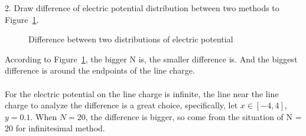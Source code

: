 \documentclass[10pt, journal, final]{IEEEtran}
\begin{document}
2. Draw difference of electric potential distribution between two methods to Figure~\ref{fig:3.1}.

\begin{figure}[htbp]
    \centering
    \caption{Difference between two distributions of electric potential}
    \label{fig:3.1}
\end{figure}
According to Figure~\ref{fig:3.1}, the bigger N is, the smaller difference is.
And the biggest difference is around the endpoints of the line charge.\\
\\
For the electric potential on the line charge is infinite,
the line near the line charge to analyze the difference is a great choice,
specifically, let $x \in [-4,4]$, $y = 0.1$.
When $N = 20$, the difference is bigger, so come from the situation of N = 20 for infinitesimal method.\par
\end{document}
